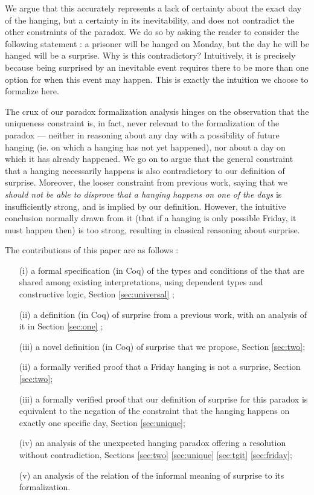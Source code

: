 \documentclass[journal]{journal}
\begin{document}
We argue that this accurately represents a lack of certainty about the exact day of
the hanging, but a certainty in its inevitability, and does not contradict
the other constraints of the paradox. We do so by asking the reader to consider the following
statement : a prisoner will be hanged on Monday, but the day he will be hanged will
be a surprise. Why is this contradictory? Intuitively, it is precisely because
being surprised by an inevitable event requires there to be more than one option for
when this event may happen. This is exactly the intuition we choose to formalize here.

The crux of our paradox formalization analysis hinges on the observation that the uniqueness constraint
  is, in fact, never relevant to the formalization of the paradox --- neither in reasoning about
  any day with a possibility of future hanging (ie. on which
  a hanging has not yet happened), nor about a day on which it has already happened.
  We go on to argue that the general constraint that a hanging necessarily happens is
   also contradictory to our definition of surprise. Moreover, the looser constraint
  from previous work,
  saying that we \emph{should not be able to disprove that a hanging happens on one of the
  days} is insufficiently strong, and is implied by our definition.
  However, the intuitive conclusion normally drawn from it
  (that if a hanging is only possible Friday, it must happen then)
  is too strong, resulting in classical reasoning about surprise.

  The contributions of this paper are as follows :

  \begin{itemize}
    \item[(i)] a formal specification (in Coq) of the types and conditions of the that
    are shared among existing interpretations, using dependent types and constructive logic,
    Section \ref{sec:universal} ;
    \item[(ii)] a definition (in Coq) of surprise from a previous work, with an analysis of it
    in Section \ref{sec:one} ;
    \item[(iii)] a novel definition (in Coq) of surprise that we propose,
    Section \ref{sec:two};
    \item[(ii)] a formally verified proof that a Friday hanging is not a surprise, Section \ref{sec:two};
    \item[(iii)] a formally verified proof that our definition of
    surprise for this paradox is equivalent to the negation of the
    constraint that the hanging happens on exactly one specific day, Section \ref{sec:unique};
    \item[(iv)] an analysis of the unexpected hanging paradox offering a resolution without
    contradiction, Sections \ref{sec:two} \ref{sec:unique} \ref{sec:tgit} \ref{sec:friday};
    \item[(v)] an analysis of the relation of the informal meaning of surprise
    to its formalization.
  \end{itemize}
\end{document}
